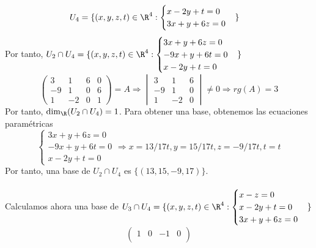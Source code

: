 \begin{ejercicio}
\begin{enumerate}
\begin{align*}
        U_4 &= \{(x,y,z,t) \in \R^4 : \begin{cases}
            x - 2y + t = 0 \\
            3x + y + 6z = 0
        \end{cases}\}
    \end{align*}
    Por tanto, $U_2 \cap U_4 = \{(x,y,z,t) \in \R^4 : \begin{cases}
        3x + y + 6z = 0 \\
        -9x + y + 6t = 0 \\
        x - 2y + t = 0
    \end{cases}\}$
    \begin{equation*}
        \begin{pmatrix}
            3 & 1 & 6 & 0 \\
            -9 & 1 & 0 & 6 \\
            1 & -2 & 0 & 1
        \end{pmatrix} = A \Rightarrow \begin{vmatrix}
            3 & 1 & 6 \\
            -9 & 1 & 0 \\
            1 & -2 & 0
        \end{vmatrix} \neq 0 \Rightarrow rg(A) = 3
    \end{equation*}
    Por tanto, $\dim_\R(U_2 \cap U_4) = 1$. Para obtener una base, obtenemos las ecuaciones paramétricas
    \begin{equation*}
        \begin{cases}
            3x + y + 6z = 0 \\
            -9x + y + 6t = 0 \\
            x - 2y + t = 0
        \end{cases} \Rightarrow x = 13/17t, y = 15/17t, z = -9/17t, t = t
    \end{equation*}
    Por tanto, una base de $U_2 \cap U_4$ es $\{(13, 15, -9, 17)\}$.
    \\ \\
    Calculamos ahora una base de $U_3 \cap U_4 = \{(x,y,z,t) \in \R^4 : \begin{cases}
        x - z = 0 \\
        x - 2y + t = 0 \\
        3x + y + 6z = 0
    \end{cases}\}$
    \begin{equation*}
        \begin{pmatrix}
            1 & 0 & -1 & 0 \\

\end{pmatrix}
\end{equation*}
\end{enumerate}
\end{ejercicio}
